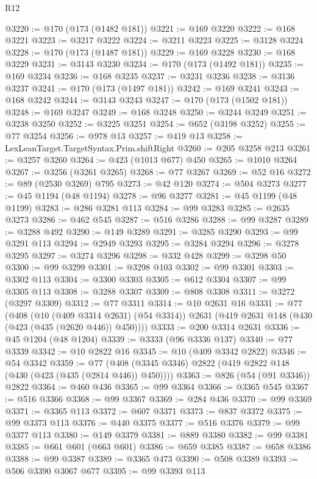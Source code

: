 \begin{lexlean}{R12}
\begin{coremodule}
{{{{{{{{{{{{{{{{{{{{{{{{{{{{{{{{{{{{{{{{{{{{{{{{{{{{{{{{{{{{{{{{{{{{{{{{{{{{{{{{{{{{{{{{{{{{{{{{{{{{{{{{{{@3220 := @170 (@173 (@1482 @181))
@3221 := @169 @3220
@3222 := @168 @3221
@3223 := @3217 @3222
@3224 := @3211 @3223
@3225 := @3128 @3224
@3228 := @170 (@173 (@1487 @181))
@3229 := @169 @3228
@3230 := @168 @3229
@3231 := @3143 @3230
@3234 := @170 (@173 (@1492 @181))
@3235 := @169 @3234
@3236 := @168 @3235
@3237 := @3231 @3236
@3238 := @3136 @3237
@3241 := @170 (@173 (@1497 @181))
@3242 := @169 @3241
@3243 := @168 @3242
@3244 := @3143 @3243
@3247 := @170 (@173 (@1502 @181))
@3248 := @169 @3247
@3249 := @168 @3248
@3250 := @3244 @3249
@3251 := @3238 @3250
@3252 := @3225 @3251
@3254 := @652 (@3198 @3252)
@3255 := @77 @3254
@3256 := @978 @13
@3257 := @419 @13
@3258 := LexLeanTarget.TargetSyntax.Prim.shiftRight
@3260 := @205 @3258 @213
@3261 := @3257 @3260
@3264 := @423 (@1013 @677) @450
@3265 := @1010 @3264
@3267 := @3256 (@3261 @3265)
@3268 := @77 @3267
@3269 := @52 @16
@3272 := @89 (@2530 @3269) @795
@3273 := @42 @120
@3274 := @504 @3273
@3277 := @45 @1194 (@48 @1194)
@3278 := @96 @3277
@3281 := @45 @1199 (@48 @1199)
@3283 := @286 @3281 @113
@3284 := @99 @3283
@3285 := @2635 @3273
@3286 := @462 @545
@3287 := @516 @3286
@3288 := @99 @3287
@3289 := @3288 @492
@3290 := @149 @3289
@3291 := @3285 @3290
@3293 := @99 @3291 @113
@3294 := @2949 @3293
@3295 := @3284 @3294
@3296 := @3278 @3295
@3297 := @3274 @3296
@3298 := @332 @428
@3299 := @3298 @50
@3300 := @99 @3299
@3301 := @3298 @103
@3302 := @99 @3301
@3303 := @3302 @113
@3304 := @3300 @3303
@3305 := @612 @3304
@3307 := @99 @3305 @113
@3308 := @3288 @3307
@3309 := @808 @3308
@3311 := @3272 (@3297 @3309)
@3312 := @77 @3311
@3314 := @10 @2631 @16
@3331 := @77
    (@408
      (@10 (@409 @3314 @2631) (@54 @3314))
      @2631
      (@419 @2631 @148 (@430 (@423 (@435 (@2620 @446)) @450))))
@3333 := @200 @3314 @2631
@3336 := @45 @1204 (@48 @1204)
@3339 := @3333 (@96 @3336 @137)
@3340 := @77 @3339
@3342 := @10 @2822 @16
@3345 := @10 (@409 @3342 @2822)
@3346 := @54 @3342
@3359 := @77 (@408 (@3345 @3346) @2822 (@419 @2822 @148 (@430 (@423 (@435 (@2814 @446)) @450))))
@3363 := @826 (@54 (@91 @3346)) @2822
@3364 := @460 @436
@3365 := @99 @3364
@3366 := @3365 @545
@3367 := @516 @3366
@3368 := @99 @3367
@3369 := @284 @436
@3370 := @99 @3369
@3371 := @3365 @113
@3372 := @607 @3371
@3373 := @837 @3372
@3375 := @99 @3373 @113
@3376 := @440 @3375
@3377 := @516 @3376
@3379 := @99 @3377 @113
@3380 := @149 @3379
@3381 := @889 @3380
@3382 := @99 @3381
@3385 := @661 @601 (@663 @601)
@3386 := @659 @3385
@3387 := @658 @3386
@3388 := @99 @3387
@3389 := @3365 @473
@3390 := @508 @3389
@3393 := @506 @3390 @3067 @677
@3395 := @99 @3393 @113
}}}}}}}}}}}}}}}}}}}}}}}}}}}}}}}}}}}}}}}}}}}}}}}}}}}}}}}}}}}}}}}}}}}}}}}}}}}}}}}}}}}}}}}}}}}}}}}}}}}}}}}}}}
\end{coremodule}
\end{lexlean}
